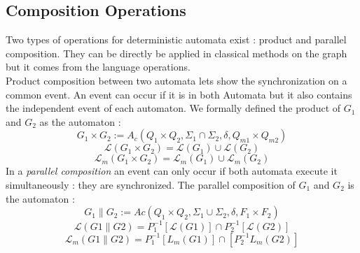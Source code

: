 \subsection{Composition Operations}
Two types of operations for deterministic automata exist : product and parallel composition. They can be directly be applied in classical methods on the graph but it comes from the language operations.\\ 
Product composition between two automata lets show the synchronization on a common event. An event can occur if it is in both Automata but it also contains the independent event of each automaton. We formally defined the product of $G_1$ and $G_2$ as the automaton : 
\begin{equation*}
G_1 \times G_2 := A_c (Q_1 \times Q_2, \Sigma_1 \cap \Sigma_2, \delta, Q_{m1} \times Q_{m2})
\end{equation*}
\begin{equation*}
\mathcal{L}(G_1 \times G_2) = \mathcal{L}(G_1) \cup \mathcal{L}(G_2)
\end{equation*}
\begin{equation*}
\mathcal{L}_m(G_1 \times G_2) = \mathcal{L}_m(G_1) \cup \mathcal{L}_m(G_2)
\end{equation*}
 In a \textit{parallel composition} an event can only  occur if both automata execute it simultaneously : they are synchronized.
 The parallel composition of $G_1$ and $G_2$ is the automaton :
 \begin{equation*}
 G_1 \parallel G_2 := Ac ( Q_1 \times Q_2,\Sigma_1 \cup \Sigma_2, \delta, F_1\times F_2)
 \end{equation*}
 \begin{equation*}
 \mathcal{L}(G1\parallel G2) = P_1^{-1}  [\mathcal{L}(G1)] \cap P_2^{-1}  [\mathcal{L}(G2)]
 \end{equation*}
 \begin{equation*}
 \mathcal{L}_m(G1\parallel G2) = P_1^{-1}[{L}_m(G1)] \cap [P_2^{-1}{L}_m(G2)]
 \end{equation*}
 
 
